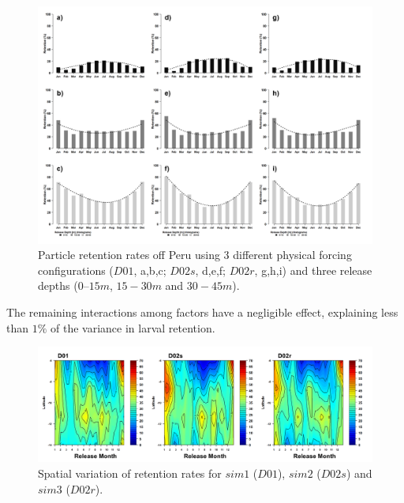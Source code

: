 \begin{center}
\begin{figure}[H]
	\includegraphics[width=1.0\textwidth]{figures/Chap2Recruitment3sim3depth.png}
	\centering
	\caption{Particle retention rates off Peru using 3 different physical forcing configurations ($D01$, a,b,c; $D02s$, d,e,f; $D02r$, g,h,i) and three release depths ($0 – 15 m$, $15 - 30 m$ and $30 - 45 m$).}
	\label{Chap2Recruitment3sim3depth}
\end{figure}
\end{center}

The remaining interactions among factors have a negligible effect, explaining less than $1\%$ of the variance in larval retention.\\

\begin{center}
\begin{figure}[H]
	\includegraphics[width=1.0\textwidth]{figures/Chap2SpatialVariation.png}
	\centering
	\caption{Spatial variation of retention rates for $sim 1$ ($D01$), $sim 2$ ($D02s$) and $sim 3$ ($D02r$).}
	\label{Chap2SpatialVariation}
\end{figure}
\end{center}

